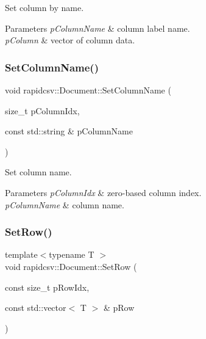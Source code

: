 Set column by name. 


\begin{DoxyParams}{Parameters}
{\em p\+Column\+Name} & column label name. \\
\hline
{\em p\+Column} & vector of column data. \\
\hline
\end{DoxyParams}
\mbox{\label{classrapidcsv_1_1Document_a4c9c8e85a9ccefea28068c460ebb725e}} 
\subsubsection{\texorpdfstring{Set\+Column\+Name()}{SetColumnName()}}
{\footnotesize\ttfamily void rapidcsv\+::\+Document\+::\+Set\+Column\+Name (\begin{DoxyParamCaption}\item[{size\+\_\+t}]{p\+Column\+Idx,  }\item[{const std\+::string \&}]{p\+Column\+Name }\end{DoxyParamCaption})\hspace{0.3cm}{\ttfamily [inline]}}



Set column name. 


\begin{DoxyParams}{Parameters}
{\em p\+Column\+Idx} & zero-\/based column index. \\
\hline
{\em p\+Column\+Name} & column name. \\
\hline
\end{DoxyParams}
\mbox{\label{classrapidcsv_1_1Document_a66ad9bc5f756fd0265b6852a325e3e43}} 
\subsubsection{\texorpdfstring{Set\+Row()}{SetRow()}\hspace{0.1cm}{\footnotesize\ttfamily [1/2]}}
{\footnotesize\ttfamily template$<$typename T $>$ \\
void rapidcsv\+::\+Document\+::\+Set\+Row (\begin{DoxyParamCaption}\item[{const size\+\_\+t}]{p\+Row\+Idx,  }\item[{const std\+::vector$<$ T $>$ \&}]{p\+Row }\end{DoxyParamCaption})\hspace{0.3cm}{\ttfamily [inline]}}



